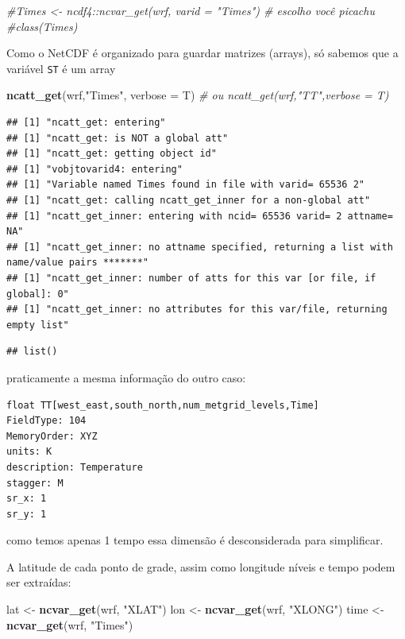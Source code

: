 \documentclass[]{book}
\newenvironment{Shaded}{\begin{snugshade}}{\end{snugshade}}
\newcommand{\KeywordTok}[1]{\textcolor[rgb]{0.13,0.29,0.53}{\textbf{#1}}}
\newcommand{\DataTypeTok}[1]{\textcolor[rgb]{0.13,0.29,0.53}{#1}}
\newcommand{\StringTok}[1]{\textcolor[rgb]{0.31,0.60,0.02}{#1}}
\newcommand{\CommentTok}[1]{\textcolor[rgb]{0.56,0.35,0.01}{\textit{#1}}}
\newcommand{\NormalTok}[1]{#1}
\theoremstyle{definition}
\theoremstyle{definition}
\theoremstyle{definition}
\theoremstyle{remark}
\begin{document}
\begin{Shaded}
\begin{Highlighting}[]
\CommentTok{#Times <- ncdf4::ncvar_get(wrf, varid = "Times")  # escolho você picachu}
\CommentTok{#class(Times)}
\end{Highlighting}
\end{Shaded}

Como o NetCDF é organizado para guardar matrizes (arrays), só sabemos
que a variável \texttt{ST} é um array

\begin{Shaded}
\begin{Highlighting}[]
\KeywordTok{ncatt_get}\NormalTok{(wrf,}\StringTok{"Times"}\NormalTok{, }\DataTypeTok{verbose =}\NormalTok{ T) }\CommentTok{# ou ncatt_get(wrf,"TT",verbose = T)}
\end{Highlighting}
\end{Shaded}

\begin{verbatim}
## [1] "ncatt_get: entering"
## [1] "ncatt_get: is NOT a global att"
## [1] "ncatt_get: getting object id"
## [1] "vobjtovarid4: entering"
## [1] "Variable named Times found in file with varid= 65536 2"
## [1] "ncatt_get: calling ncatt_get_inner for a non-global att"
## [1] "ncatt_get_inner: entering with ncid= 65536 varid= 2 attname= NA"
## [1] "ncatt_get_inner: no attname specified, returning a list with name/value pairs *******"
## [1] "ncatt_get_inner: number of atts for this var [or file, if global]: 0"
## [1] "ncatt_get_inner: no attributes for this var/file, returning empty list"
\end{verbatim}

\begin{verbatim}
## list()
\end{verbatim}

praticamente a mesma informação do outro caso:

\begin{verbatim}
float TT[west_east,south_north,num_metgrid_levels,Time]   
FieldType: 104
MemoryOrder: XYZ
units: K
description: Temperature
stagger: M
sr_x: 1
sr_y: 1
\end{verbatim}

como temos apenas 1 tempo essa dimensão é desconsiderada para
simplificar.

A latitude de cada ponto de grade, assim como longitude níveis e tempo
podem ser extraídas:

\begin{Shaded}
\begin{Highlighting}[]
\NormalTok{lat  <-}\StringTok{ }\KeywordTok{ncvar_get}\NormalTok{(wrf, }\StringTok{"XLAT"}\NormalTok{)}
\NormalTok{lon  <-}\StringTok{ }\KeywordTok{ncvar_get}\NormalTok{(wrf, }\StringTok{"XLONG"}\NormalTok{)}
\NormalTok{time <-}\StringTok{ }\KeywordTok{ncvar_get}\NormalTok{(wrf, }\StringTok{"Times"}\NormalTok{)}
\end{Highlighting}
\end{Shaded}
\end{document}
